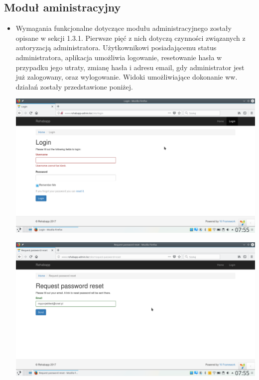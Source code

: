 \subsection{Moduł aministracyjny}

\begin{itemize}
	\item Wymagania funkcjonalne dotyczące modułu administracyjnego zostały opisane w sekcji 1.3.1. Pierwsze pięć z nich dotyczą czynności związanych z autoryzacją administratora. Użytkownikowi posiadającemu status administratora, aplikacja umożliwia logowanie, resetowanie hasła w przypadku jego utraty, zmianę hasła i adresu email, gdy administrator jest już zalogowany, oraz wylogowanie. Widoki umożliwiające dokonanie ww. działań zostały przedstawione poniżej. 

\vspace{0,5cm}
\includegraphics[scale=0.4]{obraz/1.png}
\vspace{0,5cm}

\vspace{0,5cm}
\includegraphics[scale=0.4]{obraz/2.png}
\vspace{0,5cm}


\end{itemize}
